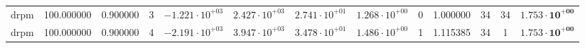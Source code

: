 \begin{table}
\begin{tabular}{ccccccccccccc}
drpm & 100.000000 & 0.900000 & 3 & $-1.221 \cdot 10^{+03}$ & $2.427 \cdot 10^{+03}$ & $2.741 \cdot 10^{+01}$ & $1.268 \cdot 10^{+00}$ & 0 & 1.000000 & 34 & 34 & $\mathbf{1.753 \cdot 10^{+00}}$ \\
drpm & 100.000000 & 0.900000 & 4 & $-2.191 \cdot 10^{+03}$ & $3.947 \cdot 10^{+03}$ & $3.478 \cdot 10^{+01}$ & $1.486 \cdot 10^{+00}$ & 1 & 1.115385 & 34 & 1 & $\mathbf{1.753 \cdot 10^{+00}}$ \\
\bottomrule
\end{tabular}
\end{table}
